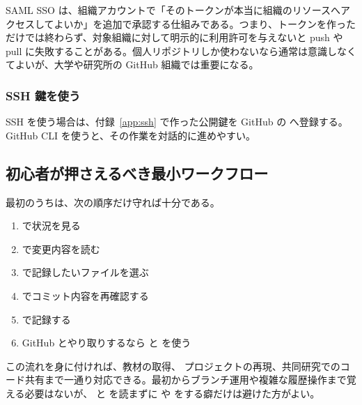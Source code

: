 SAML SSO は、組織アカウントで「そのトークンが本当に組織のリソースへアクセスしてよいか」を追加で承認する仕組みである。つまり、トークンを作っただけでは終わらず、対象組織に対して明示的に利用許可を与えないと push や pull に失敗することがある。個人リポジトリしか使わないなら通常は意識しなくてよいが、大学や研究所の GitHub 組織では重要になる。

\subsubsection{SSH 鍵を使う}

SSH を使う場合は、付録~\ref{app:ssh} で作った公開鍵を GitHub の  へ登録する。GitHub CLI  を使うと、その作業を対話的に進めやすい。

\subsection{初心者が押さえるべき最小ワークフロー}

最初のうちは、次の順序だけ守れば十分である。

\begin{enumerate}
\item {} で状況を見る
\item {} で変更内容を読む
\item {} で記録したいファイルを選ぶ
\item {} でコミット内容を再確認する
\item {} で記録する
\item GitHub とやり取りするなら  と  を使う
\end{enumerate}

この流れを身に付ければ、教材の取得、 プロジェクトの再現、共同研究でのコード共有まで一通り対応できる。最初からブランチ運用や複雑な履歴操作まで覚える必要はないが、 と  を読まずに  や  をする癖だけは避けた方がよい。
